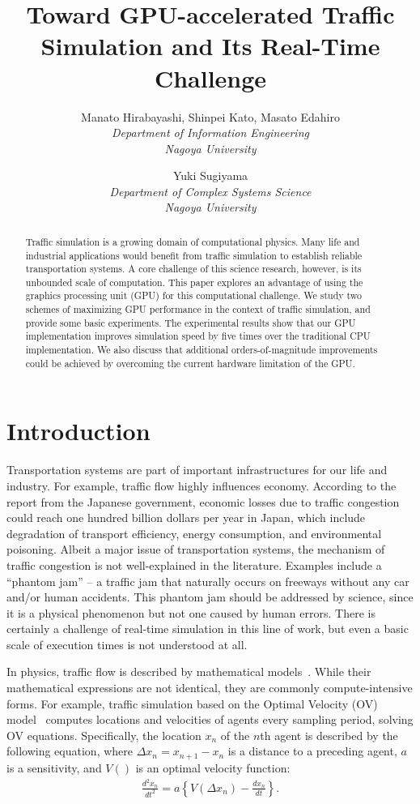 \documentclass[times, 10pt, twocolumn]{article}
\title{Toward GPU-accelerated Traffic Simulation and Its Real-Time Challenge}
\author {
Manato Hirabayashi, Shinpei Kato, Masato Edahiro\\
\textit{Department of Information Engineering}\\
\textit{Nagoya University}\\
\and
Yuki Sugiyama\\
\textit{Department of Complex Systems Science}\\
\textit{Nagoya University}\\
}
\begin{document}
\maketitle


\begin{abstract}
 Traffic simulation is a growing domain of computational physics.
 Many life and industrial applications would benefit from traffic
 simulation to establish reliable transportation systems.
 A core challenge of this science research, however, is its unbounded
 scale of computation.
 This paper explores an advantage of using the graphics processing
 unit (GPU) for this computational challenge.
 We study two schemes of maximizing GPU performance in the context of
 traffic simulation, and provide some basic experiments.
 The experimental results show that our GPU implementation improves
 simulation speed by five times over the traditional CPU
 implementation.
 We also discuss that additional orders-of-magnitude improvements could
 be achieved by overcoming the current hardware limitation of the GPU.
\end{abstract}

\section{Introduction}

Transportation systems are part of important infrastructures for our life
and industry.
For example, traffic flow highly influences economy.
According to the report from the Japanese government, economic losses
due to traffic congestion could reach one hundred billion dollars per
year in Japan, which include degradation of transport efficiency, energy
consumption, and environmental poisoning.
Albeit a major issue of transportation systems, the mechanism of traffic
congestion is not well-explained in the literature.
Examples include a ``phantom jam'' -- a traffic jam that naturally
occurs on freeways without any car and/or human accidents.
This phantom jam should be addressed by science, since it is a physical
phenomenon but not one caused by human errors.
There is certainly a challenge of real-time simulation in this line of
work, but even a basic scale of execution times is not understood at all.

In physics, traffic flow is described by mathematical
models~\cite{Bando1995, Bando1995_2, Kerner1993, Nagel1992}.
While their mathematical expressions are not identical, they are
commonly compute-intensive forms.
For example, traffic simulation based on the Optimal Velocity (OV)
model~\cite{Bando1995, Bando1995_2} computes locations and velocities of
agents every sampling period, solving OV equations. 
Specifically, the location $x_n$ of the $n$th agent is described by the
following equation, where $\Delta x_n = x_{n+1} - x_n$ is a distance to
a preceding agent, $a$ is a sensitivity, and $V()$ is an optimal
velocity function:
\begin{eqnarray}
 \label{eqn:ov}
 \frac{d^2 x_n}{d t^2} = a \left\{V(\Delta x_n) - \frac{d x_n}{d t}\right\}.
\end{eqnarray}
\end{document}
